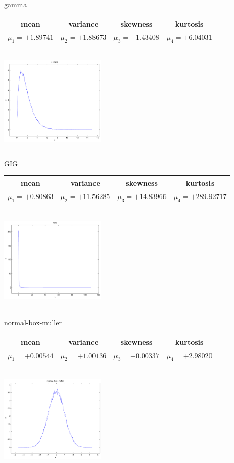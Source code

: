 \documentclass[9pt]{article}
\theoremstyle{plain}
\theoremstyle{definition}
\theoremstyle{remark}
\numberwithin{equation}{section}
\begin{document}
\newpage
gamma \begin{tabular}{|c|c|c|c|}  mean & variance & skewness & kurtosis \\  \hline
$\mu_1 = +1.89741$ & $\mu_2 = +1.88673$ & $\mu_3 = +1.43408$ & $\mu_4 =+6.04031$ \\
\end{tabular}

\includegraphics[width=5cm,height=5cm]{gamma.pdf}

GIG \begin{tabular}{|c|c|c|c|}  mean & variance & skewness & kurtosis \\  \hline
$\mu_1 = +0.80863$ & $\mu_2 = +11.56285$ & $\mu_3 = +14.83966$ & $\mu_4 =+289.92717$ \\
\end{tabular}

\includegraphics[width=5cm,height=5cm]{GIG.pdf}

normal-box-muller \begin{tabular}{|c|c|c|c|}  mean & variance & skewness & kurtosis \\  \hline
$\mu_1 = +0.00544$ & $\mu_2 = +1.00136$ & $\mu_3 = -0.00337$ & $\mu_4 =+2.98020$ \\
\end{tabular}

\includegraphics[width=5cm,height=5cm]{normal-box-muller.pdf}
\end{document}
